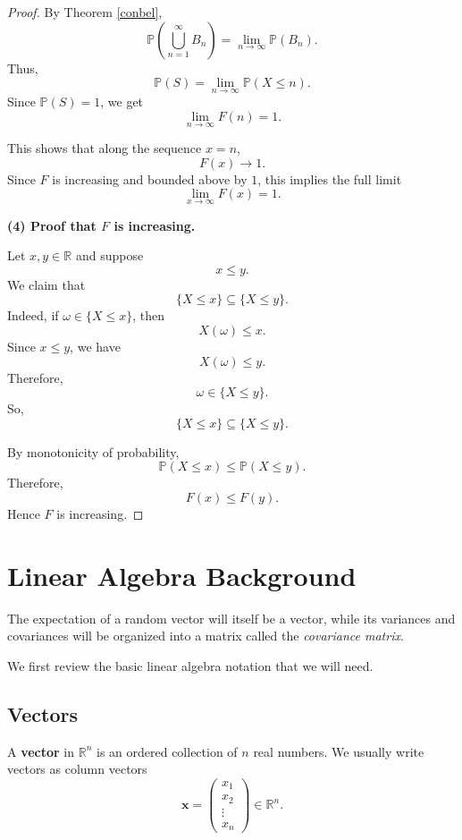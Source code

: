 \documentclass[11pt]{article}
\newcommand{\Prob}{\mathbb{P}}
\newcommand{\Sample}{S}
\theoremstyle{definition}
\theoremstyle{plain}
\theoremstyle{remark}
\begin{document}
\begin{proof}
By Theorem \ref{conbel},
\[
\Prob\left(\bigcup_{n=1}^{\infty}B_n\right)
=
\lim_{n\to\infty}\Prob(B_n).
\]
Thus,
\[
\Prob(\Sample)
=
\lim_{n\to\infty}\Prob(X\le n).
\]
Since $\Prob(\Sample)=1$, we get
\[
\lim_{n\to\infty}F(n)=1.
\]

This shows that along the sequence $x=n$,
\[
F(x)\to1.
\]
Since $F$ is increasing and bounded above by $1$, this implies the full limit
\[
\lim_{x\to\infty}F(x)=1.
\]

\medskip

\noindent
\textbf{(4) Proof that $F$ is increasing.}

Let $x,y\in\mathbb{R}$ and suppose
\[
x\le y.
\]
We claim that
\[
\{X\le x\}\subseteq \{X\le y\}.
\]
Indeed, if $\omega\in\{X\le x\}$, then
\[
X(\omega)\le x.
\]
Since $x\le y$, we have
\[
X(\omega)\le y.
\]
Therefore,
\[
\omega\in\{X\le y\}.
\]
So,
\[
\{X\le x\}\subseteq \{X\le y\}.
\]

By monotonicity of probability,
\[
\Prob(X\le x)\le \Prob(X\le y).
\]
Therefore,
\[
F(x)\le F(y).
\]
Hence $F$ is increasing.
\end{proof}














\section{Linear Algebra Background}

The expectation of a random vector will itself be a vector, while its
variances and covariances will be organized into a matrix called the
\emph{covariance matrix}.

We first review the basic linear algebra notation that we will need.


\subsection*{Vectors}

A \textbf{vector} in $\mathbb{R}^n$ is an ordered collection of $n$
real numbers. We usually write vectors as column vectors
\[
\mathbf{x}
=
\begin{pmatrix}
x_1\\
x_2\\
\vdots\\
x_n
\end{pmatrix}\in \mathbb{R}^n.
\]
\end{document}
